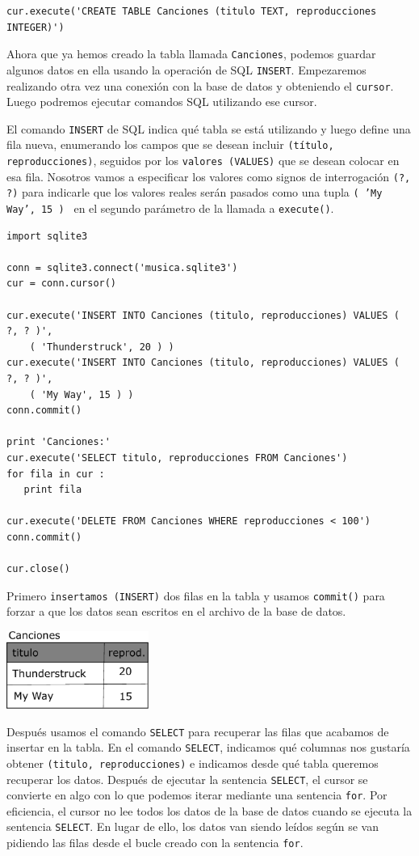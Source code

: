 \beforeverb
\begin{verbatim}
cur.execute('CREATE TABLE Canciones (titulo TEXT, reproducciones INTEGER)')
\end{verbatim}
\afterverb
%
Ahora que ya hemos creado la tabla llamada {\tt Canciones}, podemos guardar
algunos datos en ella usando la operación de SQL {\tt INSERT}. Empezaremos
realizando otra vez una conexión con la base de datos y obteniendo el {\tt cursor}.
Luego podremos ejecutar comandos SQL utilizando ese cursor.

El comando {\tt INSERT} de SQL indica qué tabla se está utilizando
y luego define una fila nueva, enumerando los campos que se desean
incluir {\tt (título, reproducciones)}, seguidos por los {\tt valores (VALUES)} que
se desean colocar en esa fila. Nosotros vamos a especificar los valores como signos de interrogación
{\tt (?, ?)} para indicarle que los valores reales serán pasados como una
tupla {\tt ( 'My Way', 15 ) } en el segundo parámetro de la
llamada a {\tt execute()}.

\beforeverb
\begin{verbatim}
import sqlite3

conn = sqlite3.connect('musica.sqlite3')
cur = conn.cursor()

cur.execute('INSERT INTO Canciones (titulo, reproducciones) VALUES ( ?, ? )', 
    ( 'Thunderstruck', 20 ) )
cur.execute('INSERT INTO Canciones (titulo, reproducciones) VALUES ( ?, ? )', 
    ( 'My Way', 15 ) )
conn.commit()

print 'Canciones:'
cur.execute('SELECT titulo, reproducciones FROM Canciones')
for fila in cur :
   print fila

cur.execute('DELETE FROM Canciones WHERE reproducciones < 100')
conn.commit()

cur.close()
\end{verbatim}
\afterverb
%
Primero {\tt insertamos (INSERT)} dos filas en la tabla y usamos {\tt commit()}
para forzar a que los datos sean escritos en el archivo de la base de datos.

\beforefig
\centerline{\includegraphics[height=1.00in]{figs2/tracks.eps}}
\afterfig

Después usamos el comando {\tt SELECT} para
recuperar las filas que acabamos de insertar en la tabla.
En el comando
{\tt SELECT}, indicamos qué columnas nos gustaría obtener {\tt (titulo, reproducciones)}
e indicamos desde qué tabla queremos recuperar los datos. Después de
ejecutar la sentencia {\tt SELECT}, el cursor se convierte en algo con lo que podemos
iterar mediante una sentencia {\tt for}. Por eficiencia,
el cursor no lee todos los datos de la base de datos
cuando se ejecuta la sentencia {\tt SELECT}.
En lugar de ello, los datos van siendo leídos según
se van pidiendo las filas desde el bucle creado con la sentencia {\tt for}.

